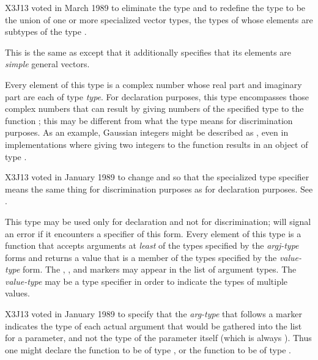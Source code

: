 \begin{flushdesc}
\begin{newer}
X3J13 voted in March 1989 
to eliminate the type  and to redefine the type
 to be the union of one or more specialized vector
types, the types of whose elements are subtypes of the type .
\end{newer}

\item[\cd{(simple-vector {\it size})}]
This is the same
as  except that it additionally specifies
that its elements are {\it simple} general vectors.

\item[\cd{(complex {\it type})}]
Every element of this type is a
complex number whose real part
and imaginary part are each of type {\it type}.
For declaration purposes, this type encompasses those complex numbers
that can result by giving numbers of the specified type
to the function ; this may be different
from what the type means for discrimination purposes.
As an example, Gaussian integers might be
described as , even in implementations
where giving two integers to the function  results
in an object of type .

\begin{new}
X3J13 voted in January 1989
to change  and 
so that the specialized 
type specifier means the same thing for discrimination purposes
as for declaration purposes.
See .
\end{new}


\item[\cd{(function ({\it arg1-type} {\it arg2-type} ...) {\it value-type})}]
\relax This type may be used only for declaration and not for
discrimination;  will signal an error if it encounters a specifier of
this form. Every element of this type is
a function that accepts arguments at {\it least} of the
types specified by the {\it argj-type} forms and returns a value that is a
member of the types specified by the {\it value-type} form.  The
, , and  markers
may appear in the list of argument types.
The {\it value-type} may be a  type specifier
in order to indicate the types of multiple values.

\begin{new}
X3J13 voted in January 1989
to specify that the {\it arg-type} that
follows a  marker indicates the type of each actual argument
that would be gathered into the list for a  parameter,
and not the type of the  parameter itself (which is always
).  Thus one might declare the function  to
be of type , or
the function  to be of type
.
\end{new}


\end{flushdesc}
